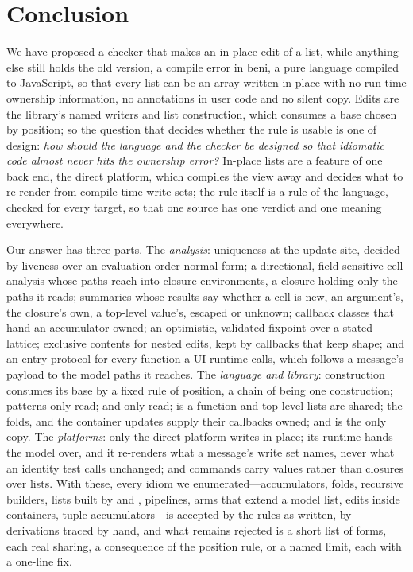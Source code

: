 \chapter{Conclusion}
\label{sec:conclusion}

We have proposed a checker that makes an in-place edit of a list, while anything else still holds the
old version, a compile error in beni, a pure language compiled to JavaScript, so that every list can be
an array written in place with no run-time ownership information, no annotations in user code and no
silent copy. Edits are the library's named writers and list construction, which consumes a base chosen
by position; so the question that decides whether the rule is usable is one of design: \emph{how should
the language and the checker be designed so that idiomatic code almost never hits the ownership error?}
In-place lists are a feature of one back end, the direct platform, which compiles the view away and
decides what to re-render from compile-time write sets; the rule itself is a rule of the language, checked
for every target, so that one source has one verdict and one meaning everywhere.

Our answer has three parts. The \emph{analysis}: uniqueness at the update site, decided by liveness over
an evaluation-order normal form; a directional, field-sensitive cell analysis whose paths reach into
closure environments, a closure holding only the paths it reads; summaries whose results say whether a
cell is new, an argument's, the closure's own, a top-level value's, escaped or unknown; callback classes
that hand an accumulator owned; an optimistic, validated fixpoint over a stated lattice; exclusive contents
for nested edits, kept by callbacks that keep shape; and an entry protocol for every function a UI runtime
calls, which follows a message's payload to the model paths it reaches. The \emph{language and library}:
construction consumes its base by a fixed rule of position, a chain of \code{++} being one construction;
patterns only read;  and  only read;  is a function and top-level lists are
shared; the folds,  and the container updates supply their callbacks owned; and 
is the only copy. The \emph{platforms}: only the direct platform writes in place; its runtime hands the
model over, and it re-renders what a message's write set names, never what an identity test calls
unchanged; and commands carry values rather than closures over lists. With these, every idiom we
enumerated---accumulators, folds, recursive builders, lists built by  and , pipelines,
 arms that extend a model list, edits inside containers, tuple accumulators---is accepted by
the rules as written, by derivations traced by hand, and what remains rejected is a short list of forms,
each real sharing, a consequence of the position rule, or a named limit, each with a one-line fix.


